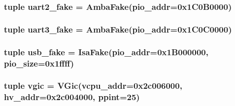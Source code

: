 \label{classRealView_1_1VExpress__EMM_ae8df5f47228f3c94133173ef497a4203}
\hypertarget{classRealView_1_1VExpress__EMM_a0c7e8be915fc7946adb67f2522bf26b1}{
\subsubsection[{uart2\_\-fake}]{\setlength{\rightskip}{0pt plus 5cm}tuple {\bf uart2\_\-fake} = {\bf AmbaFake}(pio\_\-addr=0x1C0B0000)}}
\label{classRealView_1_1VExpress__EMM_a0c7e8be915fc7946adb67f2522bf26b1}
\hypertarget{classRealView_1_1VExpress__EMM_ac8f4703047b3e05e27410c2c79b2f043}{
\subsubsection[{uart3\_\-fake}]{\setlength{\rightskip}{0pt plus 5cm}tuple {\bf uart3\_\-fake} = {\bf AmbaFake}(pio\_\-addr=0x1C0C0000)}}
\label{classRealView_1_1VExpress__EMM_ac8f4703047b3e05e27410c2c79b2f043}
\hypertarget{classRealView_1_1VExpress__EMM_af101373cb13814b6dbc0ab92b33cd0f4}{
\subsubsection[{usb\_\-fake}]{\setlength{\rightskip}{0pt plus 5cm}tuple {\bf usb\_\-fake} = {\bf IsaFake}(pio\_\-addr=0x1B000000, pio\_\-size=0x1ffff)}}
\label{classRealView_1_1VExpress__EMM_af101373cb13814b6dbc0ab92b33cd0f4}
\hypertarget{classRealView_1_1VExpress__EMM_a766044c2ee00b062946f8144e20427c5}{
\subsubsection[{vgic}]{\setlength{\rightskip}{0pt plus 5cm}tuple {\bf vgic} = {\bf VGic}(vcpu\_\-addr=0x2c006000, hv\_\-addr=0x2c004000, ppint=25)}}
